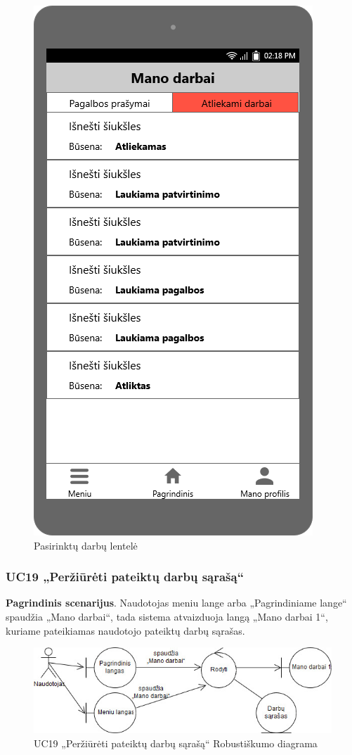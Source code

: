 \documentclass{VUMIFPSbakalaurinis}
\begin{document}
\begin{figure}[H]
	\centering
	\includegraphics[scale=0.4]{img/ScreenShots/05-Mano-darbai1}
	\caption{Pasirinktų darbų lentelė}
	\label{img:requested jobs table}
\end{figure}
\subsubsection{UC19 „Peržiūrėti pateiktų darbų sąrašą“}
\textbf{Pagrindinis scenarijus}. Naudotojas meniu lange arba „Pagrindiniame lange“ spaudžia „Mano darbai“, tada sistema atvaizduoja langą „Mano darbai 1“, kuriame pateikiamas naudotojo pateiktų darbų sąrašas.

\begin{figure}[H]
	\centering
	\includegraphics[scale=0.6]{img/Robustness/UC19}
	\caption{UC19 „Peržiūrėti pateiktų darbų sąrašą“ Robustiškumo diagrama}
	\label{img:uc19rob}
\end{figure}
\end{document}
